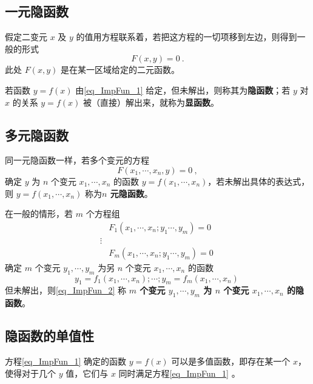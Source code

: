 
\subsection{一元隐函数}
假定二变元 $x$ 及 $y$ 的值用方程联系着，若把这方程的一切项移到左边，则得到一般的形式
\begin{equation}\label{eq_ImpFun_1}
F(x,y)=0~.
\end{equation}
此处 $F(x,y)$ 是在某一区域给定的二元函数。

若函数 $y=f(x)$ 由\autoref{eq_ImpFun_1} 给定，但未解出，则称其为\textbf{隐函数}；若 $y$ 对 $x$ 的关系 $y=f(x)$ 被（直接）解出来，就称为\textbf{显函数}。
\subsection{多元隐函数}
同一元隐函数一样，若多个变元的方程
\begin{equation}\label{eq_ImpFun_5}
F(x_1,\cdots,x_n,y)=0~,
\end{equation}
确定 $y$ 为 $n$ 个变元 $x_1,\cdots,x_n$ 的函数 $y=f(x_1,\cdots,x_n)$，若未解出具体的表达式，则 $y=f(x_1,\cdots,x_n)$ 称为\textbf{$n$ 元隐函数}。 

在一般的情形，若 $m$ 个方程组
\begin{equation}\label{eq_ImpFun_6}
\begin{aligned}
&F_1(x_1,\cdots,x_n;y_1\cdots,y_m)=0\\
\vdots\\
&F_m(x_1,\cdots,x_n;y_1\cdots,y_m)=0
\end{aligned}~
\end{equation}
确定 $m$ 个变元 $y_1,\cdots,y_m$ 为另 $n$ 个变元 $x_1,\cdots,x_n$ 的函数
\begin{equation}\label{eq_ImpFun_2}
y_1=f_1(x_1,\cdots,x_n);\cdots;y_m=f_m(x_1,\cdots,x_n)~
\end{equation}
但未解出，则\autoref{eq_ImpFun_2} 称\textbf{ $m$ 个变元 $y_1,\cdots,y_m$ 为 $n$ 个变元 $x_1,\cdots,x_n$ 的隐函数}。 
\subsection{隐函数的单值性}
方程\autoref{eq_ImpFun_1} 确定的函数 $y=f(x)$ 可以是多值函数，即存在某一个 $x$，使得对于几个 $y$ 值，它们与 $x$ 同时满足方程\autoref{eq_ImpFun_1} 。

